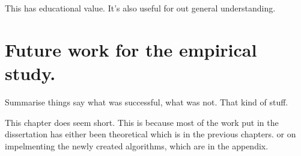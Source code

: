 This has educational value. It's also useful for out general understanding.

\section{Future work for the empirical study.}

Summarise things say what was successful, what was not. That kind of stuff.

This chapter does seem short. This is because most of the work put in the dissertation has either been theoretical which is in the previous chapters. or on impelmenting the newly created algorithms, which are in the appendix.

